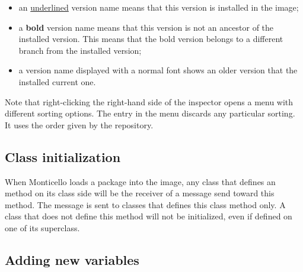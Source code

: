 \documentclass[a4paper,10pt,twoside]{book}
\begin{document}
\begin{itemize}
\item an \underline{underlined} version name means that this version is installed in the image;
\item a {\bf bold} version name means that this version is not an ancestor of the installed version. This means that the bold version belongs to a different branch from the installed version;
\item a version name displayed with a normal font shows an older version that the installed current one.
\end{itemize}

\noindent
Note that right-clicking the right-hand side of the inspector opens a menu with different sorting options. The  entry in the menu discards any particular sorting. It uses the order given by the repository.


\subsection{Class initialization}

When Monticello loads a package into the image, any class that defines an  method on its class side will be the receiver of a message send toward this method. The message  is sent to classes that defines this class method only. A class that does not define this method will not be initialized, even if defined on one of its superclass.


\subsection{Adding new variables}
\end{document}
